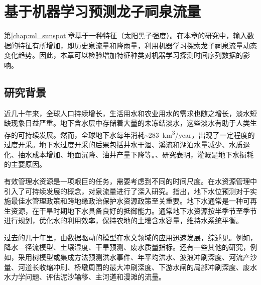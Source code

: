 \chapter{基于机器学习预测龙子祠泉流量}\label{chap:ml_spring}

第\ref{chap:ml_sunspot}章基于一种特征（太阳黑子强度）。在本章的研究中，输入数据的特征有所增加，即历史泉流量和降雨量，利用机器学习探索龙子祠泉流量动态变化趋势。因此，本章可以检验增加特征种类对机器学习探测时间序列数据的影响。

\section{研究背景}\label{sec:spr_background}

近几十年来，全球人口持续增长，生活用水和农业用水的需求也随之增长，淡水短缺现象日益严重\citep{portmann2010mirca2000,iglesias2015adaptation}。地下含水层中存储着大量的未冻结淡水，这些淡水有助于人类生存的可持续发展。然而，全球地下水每年消耗\sim\SI{283}{km^{3}/year}，出现了一定程度的过度开采\citep{wada2010global}。地下水过度开采的后果包括井水干涸、溪流和湖泊水量减少、水质退化、抽水成本增加、地面沉降、油井产量下降等\citep{bartolino2003ground,nayak2006groundwater}。\citet{dalin2017groundwater}、\citet{butler2018sustainability}研究表明，灌溉是地下水损耗的主要原因。

有效管理水资源是一项艰巨的任务，需要考虑到不同的时间尺度\citep{galelli2010building}。\citet{kresic2009groundwater}在水资源管理中引入了可持续发展的概念，对泉流量进行了深入研究。\citet{coppola2003artificial}指出，地下水位预测对于实施最佳水管理政策和跨地缘政治保护水资源政策至关重要。地下水通常是一种可再生资源，在干旱时期地下水具备良好的抵御能力。通常地下水资源按半季节至季节进行规划，优化水的利用效率，保持农地的土壤含水容量，维持水系统平衡。

过去的几十年里，由数据驱动的模型在水文领域的应用迅速发展，综述见\citep{abrahart2012two,deka2014support}。例如，降水---径流模型\citep{dibike2001model,solomatine2003model,granata2016support}、土壤湿度\citep{ahmad2010estimating}、干旱预测\citep{le2016meteorological}、废水质量指标\citep{granata2017machine}。还有一些其他的研究，例如，采用树模型或集成方法预测洪水事件\citep{solomatine2004m5}、年平均洪水\citep{singh2010estimation}、波浪冲刷深度\citep{etemad2011model}、河流产沙量\citep{goyal2014modeling}、河道长收缩冲刷\citep{najafzadeh2016scour}、桥墩周围的最大冲刷深度\citep{najafzadeh2016prediction}、下游水闸的局部冲刷深度\citep{najafzadeh2017prediction}、废水水力学问题\citep{granata2017machine}、评估泥沙输移\citep{najafzadeh2017application}、主河道和漫滩的流量\citep{zahiri2018optimized}。

